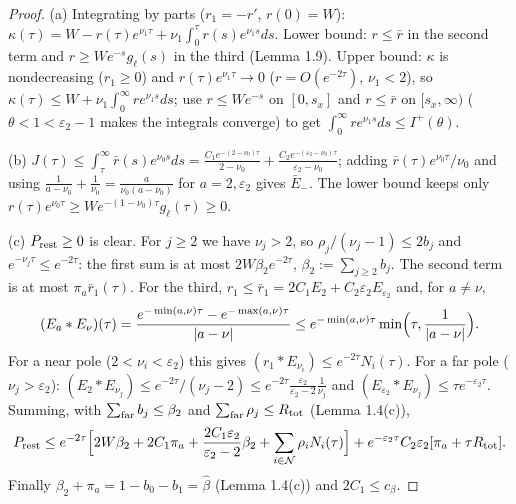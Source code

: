 \documentclass[11pt,a4paper]{article}
\theoremstyle{definition}
\theoremstyle{remark}
\begin{document}
\begin{proof}
(a) Integrating by parts ($r_1=-r'$, $r(0)=W$): $\kappa(\tau)=W-r(\tau)e^{\nu_1\tau}+\nu_1\int_0^\tau r(s)e^{\nu_1s}ds$. Lower bound: $r\le\bar r$ in the second term and $r\ge We^{-s}g_\ell(s)$ in the third (Lemma 1.9). Upper bound: $\kappa$ is nondecreasing ($r_1\ge0$) and $r(\tau)e^{\nu_1\tau}\to0$ ($r=O(e^{-2\tau})$, $\nu_1<2$), so $\kappa(\tau)\le W+\nu_1\int_0^\infty re^{\nu_1s}ds$; use $r\le We^{-s}$ on $[0,s_x]$ and $r\le\bar r$ on $[s_x,\infty)$ ($\theta<1<\varepsilon_2-1$ makes the integrals converge) to get $\int_0^\infty re^{\nu_1s}ds\le I^+(\theta)$.

(b) $J(\tau)\le\int_\tau^\infty\bar r(s)e^{\nu_0s}ds=\frac{C_1e^{-(2-\nu_0)\tau}}{2-\nu_0}+\frac{C_2e^{-(\varepsilon_2-\nu_0)\tau}}{\varepsilon_2-\nu_0}$; adding $\bar r(\tau)e^{\nu_0\tau}/\nu_0$ and using $\frac{1}{a-\nu_0}+\frac1{\nu_0}=\frac{a}{\nu_0(a-\nu_0)}$ for $a=2,\varepsilon_2$ gives $\bar E_-$. The lower bound keeps only $r(\tau)e^{\nu_0\tau}\ge We^{-(1-\nu_0)\tau}g_\ell(\tau)\ge0$.

(c) $P_{\rm rest}\ge0$ is clear. For $j\ge2$ we have $\nu_j>2$, so $\rho_j/(\nu_j-1)\le2b_j$ and $e^{-\nu_j\tau}\le e^{-2\tau}$: the first sum is at most $2W\beta_2e^{-2\tau}$, $\beta_2:=\sum_{j\ge2}b_j$. The second term is at most $\pi_a\bar r_1(\tau)$. For the third, $r_1\le\bar r_1=2C_1E_2+C_2\varepsilon_2E_{\varepsilon_2}$ and, for $a\ne\nu$,
\begin{equation*}
(E_a*E_\nu)(\tau)=\frac{e^{-\min(a,\nu)\tau}-e^{-\max(a,\nu)\tau}}{|a-\nu|}\le e^{-\min(a,\nu)\tau}\min\Bigl(\tau,\frac{1}{|a-\nu|}\Bigr).
\end{equation*}
For a near pole ($2<\nu_i<\varepsilon_2$) this gives $(r_1*E_{\nu_i})\le e^{-2\tau}N_i(\tau)$. For a far pole ($\nu_j>\varepsilon_2$): $(E_2*E_{\nu_j})\le e^{-2\tau}/(\nu_j-2)\le e^{-2\tau}\frac{\varepsilon_2}{\varepsilon_2-2}\frac1{\nu_j}$ and $(E_{\varepsilon_2}*E_{\nu_j})\le\tau e^{-\varepsilon_2\tau}$. Summing, with $\sum_{\rm far}b_j\le\beta_2$ and $\sum_{\rm far}\rho_j\le R_{\rm tot}$ (Lemma 1.4(c)),
\begin{equation*}
P_{\rm rest}\le e^{-2\tau}\Bigl[2W\beta_2+2C_1\pi_a+\frac{2C_1\varepsilon_2}{\varepsilon_2-2}\beta_2+\sum_{i\in\mathcal N}\rho_iN_i(\tau)\Bigr]+e^{-\varepsilon_2\tau}C_2\varepsilon_2[\pi_a+\tau R_{\rm tot}].
\end{equation*}
Finally $\beta_2+\pi_a=1-b_0-b_1=\hat\beta$ (Lemma 1.4(c)) and $2C_1\le c_\beta$.
\end{proof}
\end{document}
